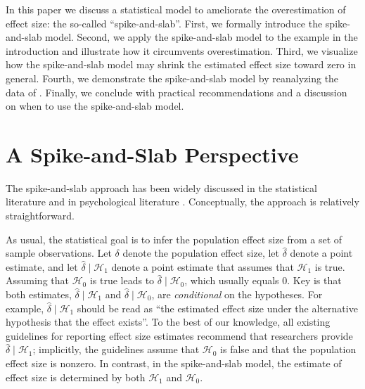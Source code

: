 \documentclass[a4paper]{article}
\newcommand{\hypo}[1]{\ensuremath{\mathcal{H}_{#1}}}
\newcommand{\popDelta}{\delta}
\newcommand{\obsDelta}{\hat{\delta}}
\newenvironment{revision}{\color{teal}}{\color{black}}
\begin{document}
\begin{revision}%
In this paper we discuss a statistical model to ameliorate the overestimation of effect size: the so-called ``spike-and-slab''. First, we formally introduce the spike-and-slab model.
Second, we apply the spike-and-slab model to the example in the introduction and illustrate how it circumvents overestimation.
Third, we visualize how the spike-and-slab model may shrink the estimated effect size toward zero in general.
Fourth, we demonstrate the spike-and-slab model by reanalyzing the data of \textcite{heycke2018two}.
Finally, we conclude with practical recommendations and a discussion on when to use the spike-and-slab model.
\end{revision}


\section*{A Spike-and-Slab Perspective}
\begin{revision}%
The spike-and-slab approach has been widely discussed in the statistical literature \parencite[e.g.,][]{ohara2009review, ishwaran2005spike, geweke1996variable, clyde1996prediction, mitchell1988bayesian} and in psychological literature \parencite[e.g.,][]{IversonEtAl2010, yu2018bayesian, RouderEtAl2018PBR, bainter2020improving}.
Conceptually, the approach is relatively straightforward.
	
As usual, the statistical goal is to infer the population effect size from a set of sample observations. Let $\popDelta$ denote the population effect size, let $\obsDelta$ denote a point estimate, and let $\obsDelta\mid\hypo{1}$ denote a point estimate that assumes that \hypo{1} is true.
Assuming that \hypo{0} is true leads to $\obsDelta\mid\hypo{0}$, which usually equals 0.
Key is that both estimates, $\obsDelta\mid\hypo{1}$ and $\obsDelta\mid\hypo{0}$, are \emph{conditional} on the hypotheses. 
For example, $\obsDelta\mid\hypo{1}$ should be read as ``the estimated effect size under the alternative hypothesis that the effect exists''. To the best of our knowledge, all existing guidelines for reporting effect size estimates recommend that researchers provide $\obsDelta\mid\hypo{1}$; implicitly, the guidelines assume that \hypo{0} is false and that the population effect size is nonzero. In contrast, in the spike-and-slab model, the estimate of effect size is determined by both \hypo{1} and \hypo{0}. 

\end{revision}%
\end{document}
